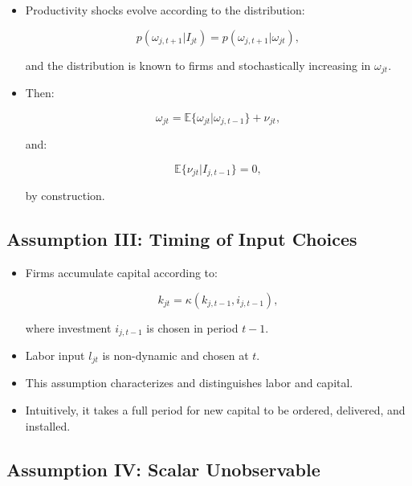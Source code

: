 \documentclass[]{book}
\providecommand{\tightlist}{%
  \setlength{\itemsep}{0pt}\setlength{\parskip}{0pt}}
\theoremstyle{definition}
\theoremstyle{definition}
\theoremstyle{definition}
\theoremstyle{remark}
\begin{document}
\begin{itemize}
\tightlist
\item
  Productivity shocks evolve according to the distribution:

  \begin{equation}
  p(\omega_{j, t + 1}|I_{jt}) = p(\omega_{j, t + 1}|\omega_{jt}), 
  \end{equation}

  and the distribution is known to firms and stochastically increasing
  in \(\omega_{jt}\).
\item
  Then:

  \begin{equation}
  \omega_{jt} = \mathbb{E}\{\omega_{jt}|\omega_{j, t - 1}\} + \nu_{jt},
  \end{equation}

  and:

  \begin{equation}
  \mathbb{E}\{\nu_{jt}|I_{j, t - 1}\} = 0,
  \end{equation}

  by construction.
\end{itemize}

\subsection{Assumption III: Timing of Input
Choices}\label{assumption-iii-timing-of-input-choices}

\begin{itemize}
\tightlist
\item
  Firms accumulate capital according to:

  \begin{equation}
  k_{jt} = \kappa(k_{j, t - 1}, i_{j, t - 1}),
  \end{equation}

  where investment \(i_{j, t - 1}\) is chosen in period \(t - 1\).
\item
  Labor input \(l_{jt}\) is non-dynamic and chosen at \(t\).
\item
  This assumption characterizes and distinguishes labor and capital.
\item
  Intuitively, it takes a full period for new capital to be ordered,
  delivered, and installed.
\end{itemize}

\subsection{Assumption IV: Scalar
Unobservable}\label{assumption-iv-scalar-unobservable}
\end{document}
